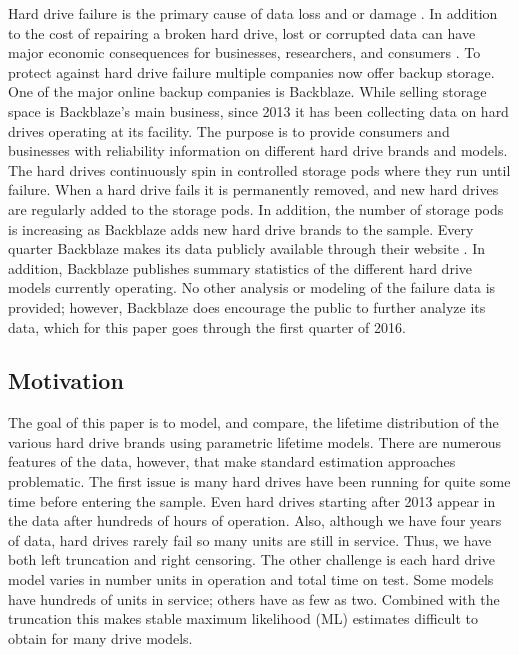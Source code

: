 \documentclass[12pt]{article}
\begin{document}
Hard drive failure is the primary cause of data loss and or damage \cite{harris}.  In addition to the cost of repairing a broken hard drive, lost or corrupted data can have major economic consequences for businesses, researchers, and consumers \cite{smith}.  To protect against hard drive failure multiple companies now offer backup storage.  One of the major online backup companies is Backblaze.  While selling storage space is Backblaze's main business, since 2013 it has been collecting data on hard drives operating at its facility.  The purpose is to provide consumers and businesses with reliability information on different hard drive brands and models.  The hard drives continuously spin in controlled storage pods where they run until failure.  When a hard drive fails it is permanently removed, and new hard drives are regularly added to the storage pods.  In addition, the number of storage pods is increasing as Backblaze adds new hard drive brands to the sample.  Every quarter Backblaze makes its data publicly available through their website \cite{backblaze}. In addition, Backblaze publishes summary statistics of the different hard drive models currently operating.  No other analysis or modeling of the failure data is provided; however, Backblaze does encourage the public to further analyze its data, which for this paper goes through the first quarter of 2016.
 
 
\subsection{Motivation}
The goal of this paper is to model, and compare, the lifetime distribution of the various hard drive brands using parametric lifetime models.  There are numerous features of the data, however, that make standard estimation approaches problematic.  The first issue is many hard drives have been running for quite some time before entering the sample.  Even hard drives starting after 2013 appear in the data after hundreds of hours of operation.  Also, although we have four years of data, hard drives rarely fail so many units are still in service.  Thus, we have both left truncation and right censoring.  The other challenge is each hard drive model varies in number units in operation and total time on test.  Some models have hundreds of units in service; others have as few as two.  Combined with the truncation this makes stable maximum likelihood (ML) estimates difficult to obtain for many drive models. \\
\end{document}
